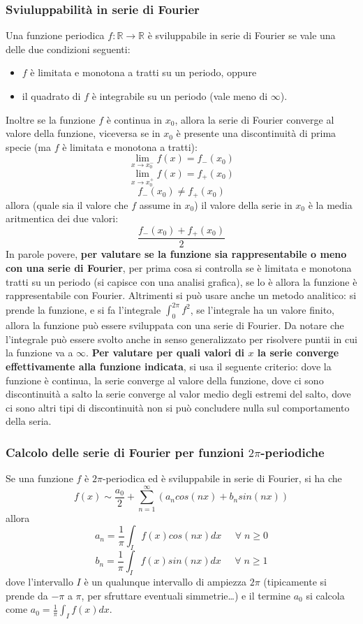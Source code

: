 \subsubsection{Sviuluppabilità in serie di Fourier}
Una funzione periodica $f: \mathbb{R} \rightarrow  \mathbb{R}$ è sviluppabile in serie di Fourier se vale una delle due condizioni seguenti:
\begin{itemize}
    \item $f$ è limitata e monotona a tratti su un periodo, oppure
    \item il quadrato di $f$ è integrabile su un periodo (vale meno di $\infty$).
\end{itemize}
Inoltre se la funzione $f$ è continua in $x_0$, allora la serie di Fourier converge al valore della funzione, viceversa se in $x_0$ è presente una discontinuità di prima specie (ma $f$ è limitata e monotona a tratti):
\[
    \lim_{x\rightarrow x_0^-} f(x) = f_-(x_0)
\]
\[
    \lim_{x\rightarrow x_0^+} f(x) = f_+(x_0)
\]
\[
    f_-(x_0) \neq f_+(x_0)
\]
allora (quale sia il valore che $f$ assume in $x_0$) il valore della serie in $x_0$ è la media aritmentica dei due valori:
\[
    \frac{f_-(x_0) + f_+(x_0)}{2}
\]
\newline
In parole povere, \textbf{per valutare se la funzione sia rappresentabile o meno con una serie di Fourier}, per prima cosa si controlla se è limitata e monotona tratti su un periodo (si capisce con una analisi grafica), se lo è allora la funzione è rappresentabile con Fourier. Altrimenti si può usare anche un metodo analitico: si prende la funzione, e si fa l'integrale $\int_{0}^{2\pi} f^2$, se l'integrale ha un valore finito, allora la funzione può essere sviluppata con una serie di Fourier. Da notare che l'integrale può essere svolto anche in senso generalizzato per risolvere puntii in cui la funzione va a $\infty$.\newline
\textbf{Per valutare per quali valori di $x$ la serie converge effettivamente alla funzione indicata}, si usa il seguente criterio: dove la funzione è continua, la serie converge al valore della funzione, dove ci sono discontinuità a salto la serie converge al valor medio degli estremi del salto, dove ci sono altri tipi di discontinuità non si può concludere nulla sul comportamento della seria.
\subsubsection{Calcolo delle serie di Fourier per funzioni $2\pi$-periodiche} 
Se una funzione $f$ è $2\pi$-periodica ed è sviluppabile in serie di Fourier, si ha che
\[
    f(x) \sim  \frac{a_0}{2} + \sum_{n=1}^{\infty}(a_n cos(nx) + b_n sin(nx))
\]
allora
\[
    a_n = \frac{1}{\pi} \int_{I} f(x) cos(nx) dx \;\;\;\; \;\forall\;n\geq0
\]
\[
    b_n = \frac{1}{\pi} \int_{I} f(x) sin(nx) dx \;\;\;\;\;\forall\;n\geq 1
\]
dove l'intervallo $I$ è un qualunque intervallo di ampiezza $2\pi$ (tipicamente si prende da $-\pi$ a $\pi$, per sfruttare eventuali simmetrie\dots) e il termine $a_0$ si calcola come $a_0 = \frac{1}{\pi} \int_{I} f(x) dx$.
